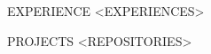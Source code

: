\documentclass{resume} %
\begin{document}






\begin{rSection}{EXPERIENCE}
    <EXPERIENCES>
\end{rSection}



\begin{rSection}{PROJECTS}    
    <REPOSITORIES>
\end{rSection}










\end{document}
